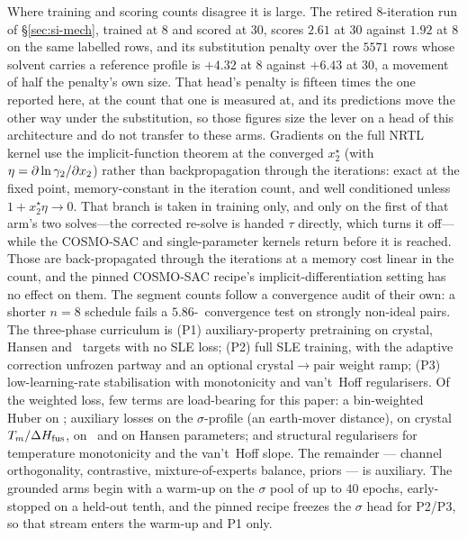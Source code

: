 Where training and scoring counts disagree it is large. The retired
$8$-iteration run of \S\ref{sec:si-mech}, trained at $8$ and scored at $30$, scores $2.61$ at $30$ against $1.92$ at $8$ on the same
labelled rows, and its substitution penalty over the $5571$ rows whose solvent carries a reference
profile is $+4.32$ at $8$ against $+6.43$ at $30$, a movement of half the penalty's own size. That
head's penalty is fifteen times the one reported here, at the count that one is measured at, and its predictions move the other way under the
substitution, so those
figures size the lever on a head of this architecture and do not transfer to these arms.
Gradients on the full NRTL kernel use the implicit-function theorem at the converged $x_2^\star$
(with $\eta=\partial\ln\gamma_2/\partial x_2$) rather than backpropagation through the iterations: exact at
the fixed point, memory-constant in the iteration count, and well conditioned unless
$1+x_2^\star\eta\to0$. That branch is taken in training only, and only on the first of that arm's
two solves---the corrected re-solve is handed $\tau$ directly, which turns it off---while the
COSMO-SAC and single-parameter kernels return before it is reached. Those are back-propagated
through the iterations at a memory cost linear in the count, and the pinned COSMO-SAC recipe's
implicit-differentiation setting has no effect on them. The segment counts follow a convergence
audit of their own: a shorter $n{=}8$
schedule fails a $5.86$-\lnx\ convergence test on strongly non-ideal pairs. The three-phase curriculum is (P1) auxiliary-property pretraining on crystal,
Hansen and \lngi\ targets with no SLE loss; (P2) full SLE training, with the adaptive correction
unfrozen partway and an optional crystal$\to$pair weight ramp; (P3) low-learning-rate stabilisation
with monotonicity and van't~Hoff regularisers. Of the weighted loss, few terms are load-bearing for
this paper: a bin-weighted Huber on \lnx; auxiliary losses on the $\sigma$-profile (an earth-mover
distance), on crystal $T_m/\Delta H_{\mathrm{fus}}$, on \lngi\ and on Hansen parameters; and structural regularisers
for temperature monotonicity and the van't~Hoff slope. The remainder --- channel orthogonality,
contrastive, mixture-of-experts balance, priors --- is auxiliary. The grounded arms begin with a
warm-up on the $\sigma$ pool of up to $40$ epochs, early-stopped on a held-out tenth, and the pinned
recipe freezes the $\sigma$ head for P2/P3, so that stream enters the warm-up and P1 only.
